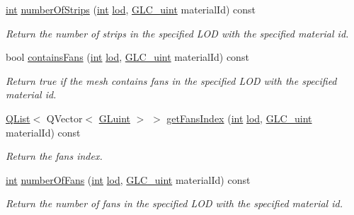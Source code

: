 \begin{DoxyCompactItemize}
\hyperlink{ioapi_8h_a787fa3cf048117ba7123753c1e74fcd6}{int} \hyperlink{class_g_l_c___mesh_a5e30af5f510ce5400196e119e06c4486}{number\-Of\-Strips} (\hyperlink{ioapi_8h_a787fa3cf048117ba7123753c1e74fcd6}{int} \hyperlink{glext_8h_a5b5a34b88a28ab9c203c2b432f6168b6}{lod}, \hyperlink{glc__global_8h_abf950976fabed69026558df8e2da6c6b}{G\-L\-C\-\_\-uint} material\-Id) const 
\begin{DoxyCompactList}\small\item\em Return the number of strips in the specified L\-O\-D with the specified material id. \end{DoxyCompactList}\item 
bool \hyperlink{class_g_l_c___mesh_a67b907f03db32d0de50bdb3e1bd7ecd8}{contains\-Fans} (\hyperlink{ioapi_8h_a787fa3cf048117ba7123753c1e74fcd6}{int} \hyperlink{glext_8h_a5b5a34b88a28ab9c203c2b432f6168b6}{lod}, \hyperlink{glc__global_8h_abf950976fabed69026558df8e2da6c6b}{G\-L\-C\-\_\-uint} material\-Id) const 
\begin{DoxyCompactList}\small\item\em Return true if the mesh contains fans in the specified L\-O\-D with the specified material id. \end{DoxyCompactList}\item 
\hyperlink{class_q_list}{Q\-List}$<$ Q\-Vector$<$ \hyperlink{glext_8h_a2f0c8cd5c21f9fcbd931c3f48bc90dfc}{G\-Luint} $>$ $>$ \hyperlink{class_g_l_c___mesh_a6321f78eb7bad8a9dc362da848cd37c5}{get\-Fans\-Index} (\hyperlink{ioapi_8h_a787fa3cf048117ba7123753c1e74fcd6}{int} \hyperlink{glext_8h_a5b5a34b88a28ab9c203c2b432f6168b6}{lod}, \hyperlink{glc__global_8h_abf950976fabed69026558df8e2da6c6b}{G\-L\-C\-\_\-uint} material\-Id) const 
\begin{DoxyCompactList}\small\item\em Return the fans index. \end{DoxyCompactList}\item 
\hyperlink{ioapi_8h_a787fa3cf048117ba7123753c1e74fcd6}{int} \hyperlink{class_g_l_c___mesh_a45472d8207d96ed3a4a9fb910fa86029}{number\-Of\-Fans} (\hyperlink{ioapi_8h_a787fa3cf048117ba7123753c1e74fcd6}{int} \hyperlink{glext_8h_a5b5a34b88a28ab9c203c2b432f6168b6}{lod}, \hyperlink{glc__global_8h_abf950976fabed69026558df8e2da6c6b}{G\-L\-C\-\_\-uint} material\-Id) const 
\begin{DoxyCompactList}\small\item\em Return the number of fans in the specified L\-O\-D with the specified material id. \end{DoxyCompactList}\item 

\end{DoxyCompactItemize}
